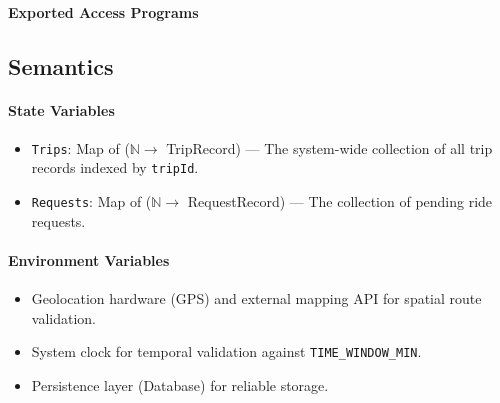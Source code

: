 \paragraph{Exported Access Programs}
\par\vspace{0.5em}

\begin{center}
\end{center}

\subsection{Semantics}

\paragraph{State Variables}
\begin{itemize}
    \item \texttt{Trips}: Map of ($\mathbb{N} \rightarrow$ TripRecord) --- The system-wide collection of all trip records indexed by \texttt{tripId}.
    \item \texttt{Requests}: Map of ($\mathbb{N} \rightarrow$ RequestRecord) --- The collection of pending ride requests.
\end{itemize}

\paragraph{Environment Variables}
\begin{itemize}
    \item Geolocation hardware (GPS) and external mapping API for spatial route validation.
    \item System clock for temporal validation against \texttt{TIME\_WINDOW\_MIN}.
    \item Persistence layer (Database) for reliable storage.
\end{itemize}

